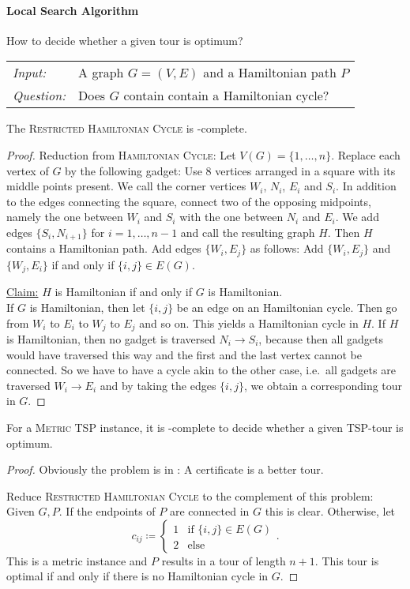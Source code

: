 \documentclass[../skript.tex]{subfiles}
\begin{document}
\paragraph{Local Search Algorithm}
How to decide whether a given tour is optimum?
\begin{problem}
\begin{tabular}{@{}ll}
\textit{Input:} & A graph $G = (V, E)$ and a Hamiltonian path $P$ \\
\textit{Question:} & Does $G$ contain contain a Hamiltonian cycle?
\end{tabular}
\end{problem}
\begin{theorem} %
\label{thm:90}
The \textsc{Restricted Hamiltonian Cycle} is \NP-complete.
\end{theorem}
\begin{proof}
Reduction from \textsc{Hamiltonian Cycle}: Let $V(G) = \{ 1, \ldots, n\}$. Replace each vertex of $G$ by the following gadget: Use 8 vertices arranged in a square with its middle points present. We call the corner vertices $W_i$, $N_i$, $E_i$ and $S_i$. In addition to the edges connecting the square, connect two of the opposing midpoints, namely the one between $W_i$ and $S_i$ with the one between $N_i$ and $E_i$. We add edges $\{ S_i, N_{i+1} \}$ for $i = 1, \ldots, n - 1$ and call the resulting graph $H$. Then $H$ contains a Hamiltonian path.
Add edges $\{ W_i, E_j \}$ as follows: Add $\{ W_i, E_j\}$ and $\{ W_j, E_i \}$ if and only if $\{ i, j\} \in E(G)$.

\underline{Claim:} $H$ is Hamiltonian if and only if $G$ is Hamiltonian. \\
If $G$ is Hamiltonian, then let $\{i, j\}$ be an edge on an Hamiltonian cycle.
Then go from $W_i$ to $E_i$ to $W_j$ to $E_j$ and so on. This yields a Hamiltonian cycle in $H$.
If $H$ is Hamiltonian, then no gadget is traversed $N_i \to S_i$, because then all gadgets would have traversed this way and the first and the last vertex cannot be connected. So we have to have a cycle akin to the other case, i.e.\ all gadgets are traversed $W_i \to E_i$ and by taking the edges $\{ i, j\}$, we obtain a corresponding tour in $G$.
\end{proof}
\begin{theorem} %
\label{thm:91}
For a \textsc{Metric TSP} instance, it is \coNP-complete to decide whether a given TSP-tour is optimum.
\end{theorem}
\begin{proof}
Obviously the problem is in \coNP: A certificate is a better tour.

Reduce \textsc{Restricted Hamiltonian Cycle} to the complement of this problem:
Given $G, P$. If the endpoints of $P$ are connected in $G$ this is clear.
Otherwise, let
\[
	c_{ij} \coloneqq \begin{cases}
	1 & \text{if } \{ i, j \} \in E(G) \\
	2 & \text{else}
	\end{cases}.
\]
This is a metric instance and $P$ results in a tour of length $n + 1$.
This tour is optimal if and only if there is no Hamiltonian cycle in $G$.
\end{proof}
\end{document}
